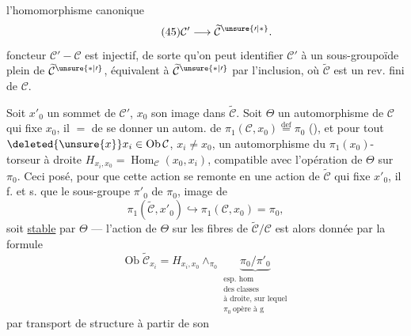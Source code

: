 l'homomorphisme canonique
\[
\tag{45}\mathcal C'\longrightarrow\widetilde{\mathcal C}^{\unsure{\prime|*}}.
\]
 foncteur $\mathcal C'-\mathcal C$ est injectif, de sorte qu'on peut identifier $\mathcal C'$ à un sous-groupoïde plein de $\widetilde{\mathcal C}^{\unsure{*|\prime}}$, équivalent à $\widetilde{\mathcal C}^{\unsure{*|\prime}}$ par l'inclusion, où $\widetilde{\mathcal C}$ est un rev. fini de $\mathcal C$.

Soit $x'_0$ un sommet de $\mathcal C'$, $x_0$ son image dans $\widetilde{\mathcal C}$. Soit $\Theta$ un automorphisme de $\mathcal C$ qui fixe $x_0$, il   $=$ de se donner un autom. de  $\pi_1(\mathcal C,x_0)\overset{\mathrm{def}}{=}\pi_0$ (), et pour tout  $\deleted{\unsure{x}}x_i\in\operatorname{Ob}\mathcal C$, $x_i\ne x_0$, un automorphisme du $\pi_1(x_0)$-torseur à droite $H_{x_i,x_0}=\operatorname{Hom}_{\mathcal C}(x_0,x_i)$, compatible avec l'opération de $\Theta$ sur $\pi_0$. Ceci posé, pour que cette action se remonte en une action de $\widetilde{\mathcal C}$ qui fixe $x'_0$, il f. et s. que le sous-groupe $\pi'_0$ de $\pi_0$, image de 
\[
\pi_1(\widetilde{\mathcal C},x'_0)\hookrightarrow\pi_1(\mathcal C,x_0)=\pi_0,
\]
soit \uline{stable} par $\Theta$ --- l'action de $\Theta$ sur les fibres  de $\widetilde{\mathcal C}/\mathcal C$ est alors donnée par la formule
\[
\tag{45}\operatorname{Ob}\widetilde{\mathcal C}_{x_i}=H_{x_i,x_0}\wedge_{\pi_0}\underbrace{\pi_0/\pi'_0}_{\substack{\text{esp. hom}\\\text{des classes}\\\text{à droite, sur lequel}\\\pi_0\ \text{opère à g}}}
\]
par transport de structure à partir de son
